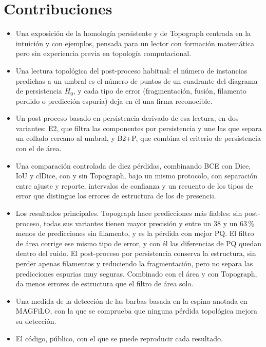 \section{Contribuciones}

\begin{itemize}
  \item Una exposición de la homología persistente y de Topograph
  centrada en la intuición y con ejemplos, pensada para un lector con
  formación matemática pero sin experiencia previa en topología
  computacional.
  \item Una lectura topológica del post-proceso habitual: el número de
  instancias predichas a un umbral es el número de puntos de un
  cuadrante del diagrama de persistencia $H_0$, y cada tipo de error
  (fragmentación, fusión, filamento perdido o predicción espuria) deja
  en él una firma reconocible.
  \item Un post-proceso basado en persistencia derivado de esa lectura,
  en dos variantes: E2, que filtra las componentes por persistencia y
  une las que separa un collado cercano al umbral, y B2+P, que combina
  el criterio de persistencia con el de área.
  \item Una comparación controlada de diez pérdidas, combinando BCE con
  Dice, IoU y clDice, con y sin Topograph, bajo un mismo protocolo, con
  separación entre ajuste y reporte, intervalos de confianza y un
  recuento de los tipos de error que distingue los errores de estructura
  de los de presencia.
  \item Los resultados principales. Topograph hace predicciones más
  fiables: sin post-proceso, todas sus variantes tienen mayor precisión
  y entre un 38 y un 63\,\% menos de predicciones sin filamento, y es la pérdida con
  mejor PQ. El filtro de área corrige ese mismo tipo de error, y con él
  las diferencias de PQ quedan dentro del ruido. El post-proceso por
  persistencia conserva la estructura, sin perder apenas filamentos y
  reduciendo la fragmentación, pero no separa las predicciones espurias
  muy seguras. Combinado con el área y con Topograph, da menos errores de
  estructura que el filtro de área solo.
  \item Una medida de la detección de las barbas basada en la espina
  anotada en MAGFiLO, con la que se comprueba que ninguna pérdida
  topológica mejora su detección.
  \item El código, público, con el que se puede reproducir cada
  resultado.
\end{itemize}

